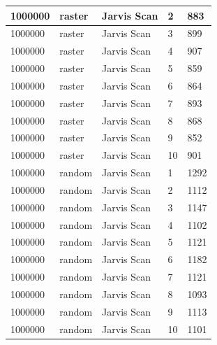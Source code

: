 \documentclass[12pt]{article}
\begin{document}
\begin{longtable}{|l|l|l|l|l|}
1000000      & raster            & Jarvis Scan & 2          & 883                           \\ \hline
1000000      & raster            & Jarvis Scan & 3          & 899                           \\ \hline
1000000      & raster            & Jarvis Scan & 4          & 907                           \\ \hline
1000000      & raster            & Jarvis Scan & 5          & 859                           \\ \hline
1000000      & raster            & Jarvis Scan & 6          & 864                           \\ \hline
1000000      & raster            & Jarvis Scan & 7          & 893                           \\ \hline
1000000      & raster            & Jarvis Scan & 8          & 868                           \\ \hline
1000000      & raster            & Jarvis Scan & 9          & 852                           \\ \hline
1000000      & raster            & Jarvis Scan & 10         & 901                           \\ \hline
1000000      & random            & Jarvis Scan & 1          & 1292                          \\ \hline
1000000      & random            & Jarvis Scan & 2          & 1112                          \\ \hline
1000000      & random            & Jarvis Scan & 3          & 1147                          \\ \hline
1000000      & random            & Jarvis Scan & 4          & 1102                          \\ \hline
1000000      & random            & Jarvis Scan & 5          & 1121                          \\ \hline
1000000      & random            & Jarvis Scan & 6          & 1182                          \\ \hline
1000000      & random            & Jarvis Scan & 7          & 1121                          \\ \hline
1000000      & random            & Jarvis Scan & 8          & 1093                          \\ \hline
1000000      & random            & Jarvis Scan & 9          & 1113                          \\ \hline
1000000      & random            & Jarvis Scan & 10         & 1101                          \\ \hline

\end{longtable}
\end{document}
